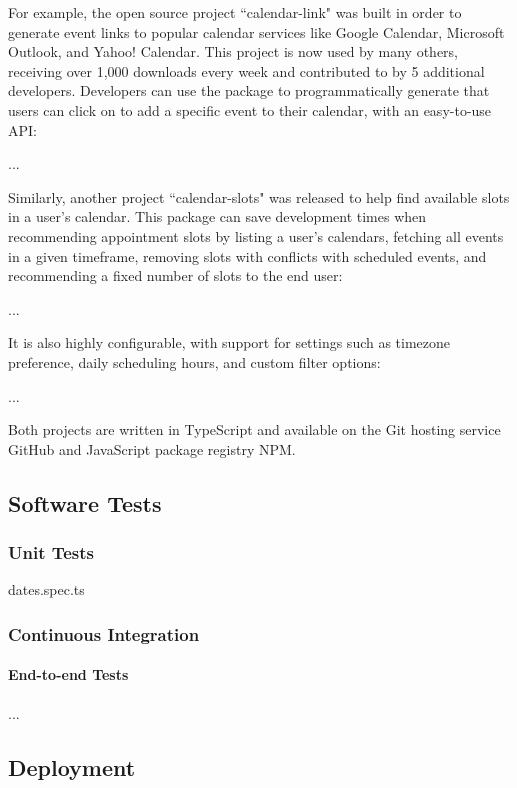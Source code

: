 \documentclass{article}
\begin{document}
For example, the open source project ``calendar-link" was built in order to generate event links to popular calendar services like Google Calendar, Microsoft Outlook, and Yahoo! Calendar. This project is now used by many others, receiving over 1,000 downloads every week and contributed to by 5 additional developers. Developers can use the package to programmatically generate that users can click on to add a specific event to their calendar, with an easy-to-use API:

...

Similarly, another project ``calendar-slots" was released to help find available slots in a user's calendar. This package can save development times when recommending appointment slots by listing a user's calendars, fetching all events in a given timeframe, removing slots with conflicts with scheduled events, and recommending a fixed number of slots to the end user:

...

It is also highly configurable, with support for settings such as timezone preference, daily scheduling hours, and custom filter options:

...

Both projects are written in TypeScript and available on the Git hosting service GitHub and JavaScript package registry NPM.

\subsection{Software Tests}

\subsubsection{Unit Tests}

dates.spec.ts

\subsubsection{Continuous Integration}

\paragraph{End-to-end Tests} ...

\subsection{Deployment}
\end{document}
